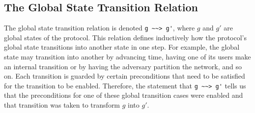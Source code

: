 
\subsection{The Global State Transition Relation}
The global state transition relation is denoted \lstinline{g ~~> g'}, where $g$ and $g'$ are global states of the protocol. This relation defines inductively how the protocol's global state transitions into another state in one step. For example, the global state may transition into another by advancing time, having one of its users make an internal transition or by having the adversary partition the network, and so on. Each transition is guarded by certain preconditions that need to be satisfied for the transition to be enabled. Therefore, the statement that \lstinline{g ~~> g'} tells us that the preconditions for one of these global transition cases were enabled and that transition was taken to transform $g$ into $g'$.

